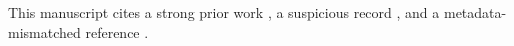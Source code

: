 \documentclass{article}
\begin{document}
This manuscript cites a strong prior work \cite{goodpaper},
a suspicious record \cite{fakepaper}, and a metadata-mismatched reference \cite{typoauthor}.


\end{document}

